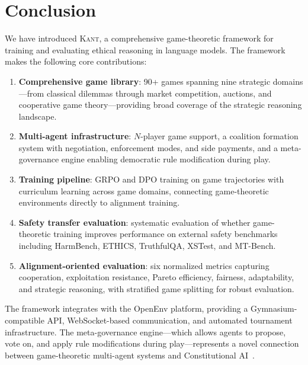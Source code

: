 
\section{Conclusion}
\label{sec:conclusion}

We have introduced \textsc{Kant}, a comprehensive game-theoretic framework
for training and evaluating ethical reasoning in language models. The
framework makes the following core contributions:

\begin{enumerate}[nosep]
    \item \textbf{Comprehensive game library}: 90+ games spanning nine
          strategic domains---from classical dilemmas through market
          competition, auctions, and cooperative game theory---providing
          broad coverage of the strategic reasoning landscape.
    \item \textbf{Multi-agent infrastructure}: $N$-player game support,
          a coalition formation system with negotiation, enforcement modes,
          and side payments, and a meta-governance engine enabling democratic
          rule modification during play.
    \item \textbf{Training pipeline}: GRPO and DPO training on game
          trajectories with curriculum learning across game domains,
          connecting game-theoretic environments directly to alignment
          training.
    \item \textbf{Safety transfer evaluation}: systematic evaluation of
          whether game-theoretic training improves performance on external
          safety benchmarks including HarmBench, ETHICS, TruthfulQA,
          XSTest, and MT-Bench.
    \item \textbf{Alignment-oriented evaluation}: six normalized metrics
          capturing cooperation, exploitation resistance, Pareto efficiency,
          fairness, adaptability, and strategic reasoning, with stratified
          game splitting for robust evaluation.
\end{enumerate}

The framework integrates with the OpenEnv platform, providing a
Gymnasium-compatible API, WebSocket-based communication, and automated
tournament infrastructure. The meta-governance engine---which allows agents
to propose, vote on, and apply rule modifications during play---represents
a novel connection between game-theoretic multi-agent systems and
Constitutional AI~\citep{bai2022constitutional}.

